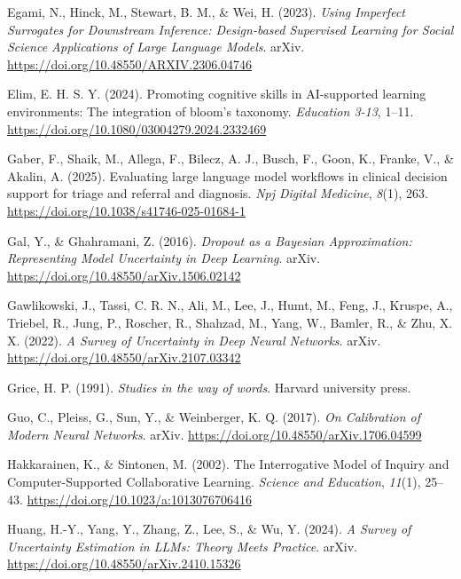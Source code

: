 \documentclass[
  12pt,
]{article}
\newlength{\cslhangindent}
\newenvironment{CSLReferences}[2] %
 {\begin{list}{}{%
  \setlength{\itemindent}{0pt}
  \setlength{\leftmargin}{0pt}
  \setlength{\parsep}{0pt}
  \ifodd #1
   \setlength{\leftmargin}{\cslhangindent}
   \setlength{\itemindent}{-1\cslhangindent}
  \fi
  \setlength{\itemsep}{#2\baselineskip}}}
 {\end{list}}
\begin{document}
\begin{CSLReferences}{1}{0}
Egami, N., Hinck, M., Stewart, B. M., \& Wei, H. (2023). \emph{Using {Imperfect} {Surrogates} for {Downstream} {Inference}: {Design}-based {Supervised} {Learning} for {Social} {Science} {Applications} of {Large} {Language} {Models}}. arXiv. \url{https://doi.org/10.48550/ARXIV.2306.04746}

Elim, E. H. S. Y. (2024). Promoting cognitive skills in {AI}-supported learning environments: The integration of bloom's taxonomy. \emph{Education 3-13}, 1--11. \url{https://doi.org/10.1080/03004279.2024.2332469}

Gaber, F., Shaik, M., Allega, F., Bilecz, A. J., Busch, F., Goon, K., Franke, V., \& Akalin, A. (2025). Evaluating large language model workflows in clinical decision support for triage and referral and diagnosis. \emph{Npj Digital Medicine}, \emph{8}(1), 263. \url{https://doi.org/10.1038/s41746-025-01684-1}

Gal, Y., \& Ghahramani, Z. (2016). \emph{Dropout as a {Bayesian} {Approximation}: {Representing} {Model} {Uncertainty} in {Deep} {Learning}}. arXiv. \url{https://doi.org/10.48550/arXiv.1506.02142}

Gawlikowski, J., Tassi, C. R. N., Ali, M., Lee, J., Humt, M., Feng, J., Kruspe, A., Triebel, R., Jung, P., Roscher, R., Shahzad, M., Yang, W., Bamler, R., \& Zhu, X. X. (2022). \emph{A {Survey} of {Uncertainty} in {Deep} {Neural} {Networks}}. arXiv. \url{https://doi.org/10.48550/arXiv.2107.03342}

Grice, H. P. (1991). \emph{Studies in the way of words}. Harvard university press.

Guo, C., Pleiss, G., Sun, Y., \& Weinberger, K. Q. (2017). \emph{On {Calibration} of {Modern} {Neural} {Networks}}. arXiv. \url{https://doi.org/10.48550/arXiv.1706.04599}

Hakkarainen, K., \& Sintonen, M. (2002). The {Interrogative} {Model} of {Inquiry} and {Computer}-{Supported} {Collaborative} {Learning}. \emph{Science and Education}, \emph{11}(1), 25--43. \url{https://doi.org/10.1023/a:1013076706416}

Huang, H.-Y., Yang, Y., Zhang, Z., Lee, S., \& Wu, Y. (2024). \emph{A {Survey} of {Uncertainty} {Estimation} in {LLMs}: {Theory} {Meets} {Practice}}. arXiv. \url{https://doi.org/10.48550/arXiv.2410.15326}


\end{CSLReferences}
\end{document}
